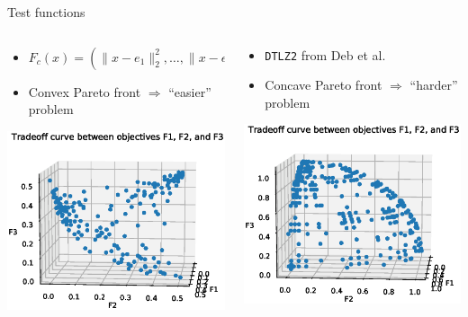 \documentclass[xcolor=dvipsnames]{beamer}
\begin{document}
\begin{frame}{Test functions}
\begin{columns}
\begin{column}{.48\textwidth}
\begin{itemize}
\item $F_{c}(x) = (\|x - e_1\|_2^2, \ldots, \|x - e_p\|_2^2)$
\item Convex Pareto front $\Rightarrow$ ``easier'' problem
\end{itemize}
\includegraphics[width=\textwidth]{f_conv_2.eps}
\end{column}
\begin{column}{.48\textwidth}
\begin{itemize}
\item {\tt DTLZ2} from Deb et al.
\item Concave Pareto front $\Rightarrow$ ``harder'' problem
\end{itemize}
\includegraphics[width=\textwidth]{dtlz2_2.eps}
\end{column}
\end{columns}
\end{frame}
\end{document}
